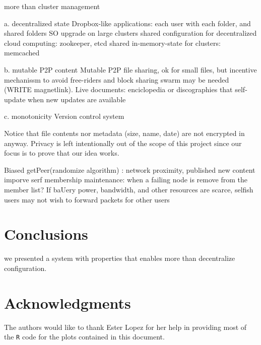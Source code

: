 \documentclass{sig-alternate}
\begin{document}
more than cluster management

a. decentralized state
    Dropbox-like applications: each user with each folder, and shared folders
    SO upgrade on large clusters
    shared configuration for decentralized cloud computing: zookeeper, etcd
    shared in-memory-state for clusters: memcached

b. mutable P2P content
    Mutable P2P file sharing, ok for small files, but incentive mechanissm to avoid free-riders and block sharing swarm may be needed (WRITE magnetlink).
    Live documents: enciclopedia or discographies that self-update when new updates are available

c. monotonicity
    Version control system

Notice that file contents nor metadata (size, name, date) are not encrypted in anyway. Privacy is left intentionally out of the scope of this project since our focus is to prove that our idea works. 


Biased getPeer(randomize algorithm) : network proximity, published new content
imporve serf membership maintenance: when a failing node is remove from the member list?
If baUery power, bandwidth, and other resources are scarce, selfish users may not wish to forward packets for other users
\section{Conclusions}

we presented a system with properties that enables more than decentralize configuration.%


\section{Acknowledgments}
The authors would like to thank Ester Lopez for her help in providing most of the \texttt{R} code for the plots contained in this document.

%

%
%
\end{document}
